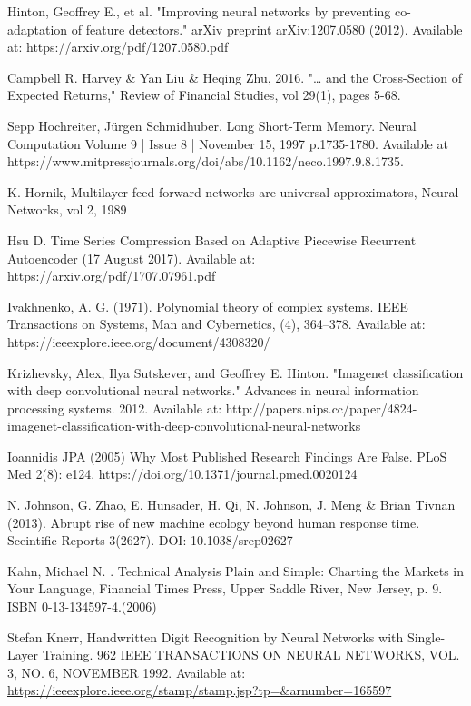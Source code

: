 \documentclass[a4paper,latin]{paper}
\begin{document}
\begin{thebibliography}{9}
Hinton, Geoffrey E., et al. "Improving neural networks by preventing co-adaptation of feature detectors." arXiv preprint arXiv:1207.0580 (2012).
Available at: https://arxiv.org/pdf/1207.0580.pdf

Campbell R. Harvey \& Yan Liu \& Heqing Zhu, 2016. "… and the Cross-Section of Expected Returns," Review of Financial Studies, vol 29(1), pages 5-68.

Sepp Hochreiter,  Jürgen Schmidhuber. Long Short-Term Memory. Neural Computation Volume 9 | Issue 8 | November 15, 1997  
p.1735-1780. Available at https://www.mitpressjournals.org/doi/abs/10.1162/neco.1997.9.8.1735.

K. Hornik, Multilayer feed-forward networks are universal approximators, Neural Networks, vol 2, 1989

Hsu D. Time Series Compression Based on Adaptive Piecewise
Recurrent Autoencoder (17 August 2017). Available at: https://arxiv.org/pdf/1707.07961.pdf

Ivakhnenko, A. G. (1971). Polynomial theory of complex systems. IEEE Transactions
on Systems, Man and Cybernetics, (4), 364–378. Available at: https://ieeexplore.ieee.org/document/4308320/

Krizhevsky, Alex, Ilya Sutskever, and Geoffrey E. Hinton. "Imagenet classification with deep convolutional neural networks." Advances in neural information processing systems. 2012.
Available at: http://papers.nips.cc/paper/4824-imagenet-classification-with-deep-convolutional-neural-networks

Ioannidis JPA (2005) Why Most Published Research Findings Are False. PLoS Med 2(8): e124. https://doi.org/10.1371/journal.pmed.0020124

N. Johnson, G. Zhao, E. Hunsader, H. Qi, N. Johnson, J. Meng \& Brian Tivnan (2013). Abrupt rise of new machine ecology beyond human response time. Sceintific Reports 3(2627). DOI: 10.1038/srep02627

Kahn, Michael N. . Technical Analysis Plain and Simple: Charting the Markets in Your Language, Financial Times Press, Upper Saddle River, New Jersey, p. 9. ISBN 0-13-134597-4.(2006)

Stefan Knerr, Handwritten Digit Recognition by Neural Networks with Single-Layer 
Training. 962 IEEE TRANSACTIONS ON NEURAL NETWORKS, VOL. 3, NO. 6, NOVEMBER 
1992. Available at: \url{https://ieeexplore.ieee.org/stamp/stamp.jsp?tp=&arnumber=165597 }



\end{thebibliography}
\end{document}
